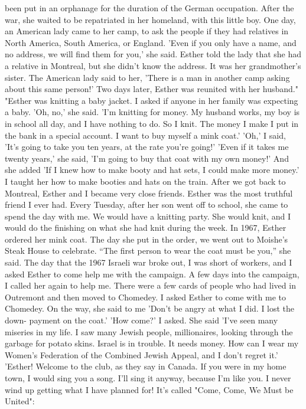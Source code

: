 been put in an orphanage for the duration of the German occupation. 
After the war, she waited to be repatriated in her homeland, with 
this little boy. One day, an American lady came to her camp, to 
ask the people if they had relatives in North America, South America, 
or England. 'Even if you only have a name, and no address, we will 
find them for you,' she said. Esther told the lady that she had a 
relative in Montreal, but she didn't know the address. It was her 
grandmother's sister. The American lady said to her, 'There is a 
man in another camp asking about this same person!' Two days later, 
Esther was reunited with her husband." 
"Esther was knitting a baby jacket. I asked if anyone in 
her family was expecting a baby. 'Oh, no,' she said. 'I'm knitting 
for money. My husband works, my boy is in school all day, 
and I have nothing to do. So I knit. The money I make I put in the 
bank in a special account. I want to buy myself a mink coat.' 
'Oh,' I said, 'It's going to take you ten years, at the rate 
you're going!' 
'Even if it takes me twenty years,' she said, 'I'm going to 
buy that coat with my own money!' And she added 'If I knew how to 
make booty and hat sets, I could make more money.' 
I taught her how to make booties and hats on the train. 
After we got back to Montreal, Esther and I became very close friends. 
Esther was the most truthful friend I ever had. Every Tuesday, 
after her son went off to school, she came to spend the day with me. 
We would have a knitting party. She would knit, and I would do the 
finishing on what she had knit during the week. 
In 1967, Esther ordered her mink coat. The day she put in the 
order, we went out to Moishe's Steak House to celebrate. 
“The first person to wear the coat must be you,” she said. 
The day that the 1967 Israeli war broke out, I was short of 
workers, and I asked Esther to come help me with the campaign. 
A few days into the campaign, I called her again to help me. There 
were a few cards of people who had lived in Outremont and then moved 
to Chomedey. I asked Esther to come with me to Chomedey. On the 
way, she said to me 'Don't be angry at what I did. I lost the down-
payment on the coat.' 
'How come?' I asked. 
She said 'I've seen many miseries in my life. I saw many Jewish people, millionaires, looking through the garbage for potato skins. Israel is in trouble. It needs money. How can I wear my 
Women's Federation of the Combined Jewish Appeal, and I don't regret 
it.' 
'Esther! Welcome to the club, as they say in Canada. If you 
were in my home town, I would sing you a song. I'll sing it anyway, 
because I'm like you. I never wind up getting what I have planned
for! It's called "Come, Come, We Must be United": 

